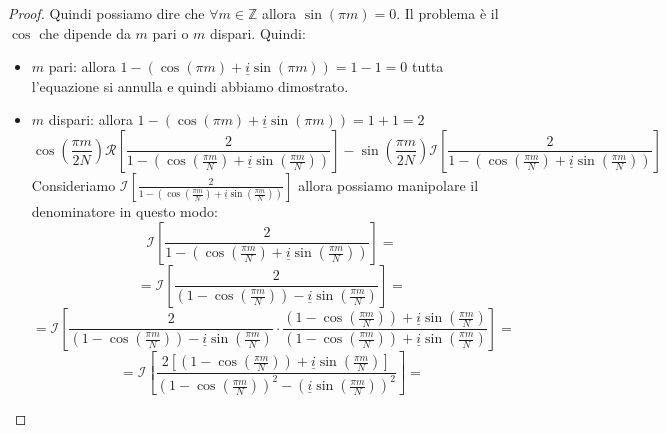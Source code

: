 \begin{teorema}
\begin{proof}
        Quindi possiamo dire che $\forall m \in \mathbb{Z}$ allora $\sin(\pi m) = 0$.
        Il problema è il $\cos$ che dipende da $m$ pari o $m$ dispari.
        Quindi:
        \begin{itemize}
            \item $m$ pari: allora $1- \left(\cos(\pi m ) + \underline{i} \sin(\pi m)\right) = 1 - 1 = 0$ 
            tutta l'equazione si annulla e quindi abbiamo dimostrato.
            \item $m$ dispari: allora $1- \left(\cos(\pi m ) + \underline{i} \sin(\pi m)\right) = 1 + 1 = 2$
        $$\cos(\frac{\pi m}{2N})\mathcal{R}\left[ \frac{2}{1-\left(\cos( \frac{\pi m }{ N}) + \underline{i} \sin( \frac{\pi m }{ N})\right)}\right] -\sin(\frac{\pi m}{2N})\mathcal{I}\left[\frac{2}{1-\left(\cos(\frac{\pi m }{N}) + \underline{i} \sin(\frac{\pi m }{N})\right)}\right]$$
        Consideriamo $\mathcal{I}\left[\frac{2}{1-\left(\cos(\frac{\pi m }{N}) + \underline{i} \sin(\frac{\pi m }{N})\right)}\right]$ allora possiamo
        manipolare il denominatore in questo modo:
        $$\mathcal{I}\left[\frac{2}{1-\left(\cos(\frac{\pi m }{N}) + \underline{i} \sin(\frac{\pi m }{N})\right)}\right]=$$
        $$=\mathcal{I}\left[\frac{2}{\left(1-\cos(\frac{\pi m }{N})\right) - \underline{i} \sin(\frac{\pi m }{N})}\right]= $$
        $$=\mathcal{I}\left[\frac{2}{\left(1-\cos(\frac{\pi m }{N})\right) - \underline{i} \sin(\frac{\pi m }{N})}\cdot \frac{\left(1-\cos(\frac{\pi m }{N})\right) + \underline{i} \sin(\frac{\pi m }{N})}{\left(1-\cos(\frac{\pi m }{N})\right) + \underline{i} \sin(\frac{\pi m }{N})}\right]= $$
        $$=\mathcal{I}\left[\frac{2\left[\left(1-\cos(\frac{\pi m }{N})\right) + \underline{i} \sin(\frac{\pi m }{N})\right]}{\left(1-\cos(\frac{\pi m }{N})\right)^2 - \left(\underline{i} \sin(\frac{\pi m }{N})\right)^2}\right]= $$
    \end{itemize}
    
    
    
    
    
    \end{proof}
\end{teorema}